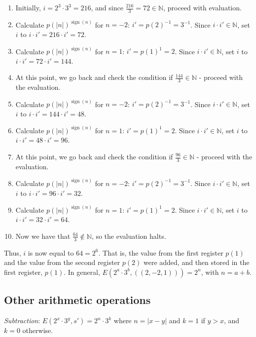 \documentclass{article}
\DeclareMathOperator{\sign}{sign}
\begin{document}
\begin{enumerate}
\item Initially, $i = 2^3 \cdot 3^3 = 216$, and since $\frac{216}{3} = 72 \in \mathbb{N}$, proceed with evaluation.
\item Calculate $p(|n|)^{\sign(n)}$ for $n = -2$: $i' = p(2)^{-1} = 3^{-1}$. Since $i \cdot i' \in \mathbb{N}$, set $i$ to $i \cdot i' = 216 \cdot i' = 72$.
\item Calculate $p(|n|)^{\sign(n)}$ for $n = 1$: $i' = p(1)^{1} = 2$. Since $i \cdot i' \in \mathbb{N}$, set $i$ to $i \cdot i' = 72 \cdot i' = 144$.
\item At this point, we go back and check the condition if $\frac{144}{3} \in \mathbb{N}$ - proceed with the evaluation.
\item Calculate $p(|n|)^{\sign(n)}$ for $n = -2$: $i' = p(2)^{-1} = 3^{-1}$. Since $i \cdot i' \in \mathbb{N}$, set $i$ to $i \cdot i' = 144 \cdot i' = 48$.
\item Calculate $p(|n|)^{\sign(n)}$ for $n = 1$: $i' = p(1)^{1} = 2$. Since $i \cdot i' \in \mathbb{N}$, set $i$ to $i \cdot i' = 48 \cdot i' = 96$.
\item At this point, we go back and check the condition if $\frac{96}{3} \in \mathbb{N}$ - proceed with the evaluation.
\item Calculate $p(|n|)^{\sign(n)}$ for $n = -2$: $i' = p(2)^{-1} = 3^{-1}$. Since $i \cdot i' \in \mathbb{N}$, set $i$ to $i \cdot i' = 96 \cdot i' = 32$.
\item Calculate $p(|n|)^{\sign(n)}$ for $n = 1$: $i' = p(1)^{1} = 2$. Since $i \cdot i' \in \mathbb{N}$, set $i$ to $i \cdot i' = 32 \cdot i' = 64$.
\item Now we have that $\frac{64}{3} \notin \mathbb{N}$, so the evaluation halts.
\end{enumerate}

Thus, $i$ is now equal to $64 = 2^6$. That is, the value from the first register $p(1)$ and the value from the second register $p(2)$ were added, and then stored in the first register, $p(1)$. In general, $E(2^a \cdot 3^b, ((2, -2, 1))) = 2^n$, with $n = a + b$.

\subsection{Other arithmetic operations}

\textit{Subtraction}: $E(2^x \cdot 3^y, s') = 2^n \cdot 3^k$ where $n = |x - y|$ and $k = 1$ if $y > x$, and $k = 0$ otherwise.
\end{document}
